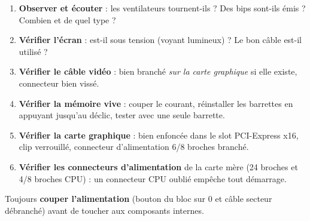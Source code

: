 \documentclass[11pt]{article}
\begin{document}
\begin{methode}
\begin{enumerate}
\item \textbf{Observer et écouter} : les ventilateurs tournent-ils ? Des bips sont-ils émis ? Combien et de quel type ?
\item \textbf{Vérifier l'écran} : est-il sous tension (voyant lumineux) ? Le bon câble est-il utilisé ?
\item \textbf{Vérifier le câble vidéo} : bien branché \emph{sur la carte graphique} si elle existe, connecteur bien vissé.
\item \textbf{Vérifier la mémoire vive} : couper le courant, réinstaller les barrettes en appuyant jusqu'au déclic, tester avec une seule barrette.
\item \textbf{Vérifier la carte graphique} : bien enfoncée dans le slot PCI-Express x16, clip verrouillé, connecteur d'alimentation 6/8 broches branché.
\item \textbf{Vérifier les connecteurs d'alimentation} de la carte mère (24 broches et 4/8 broches CPU) : un connecteur CPU oublié empêche tout démarrage.
\end{enumerate}
Toujours \textbf{couper l'alimentation} (bouton du bloc sur 0 et câble secteur débranché) avant de toucher aux composants internes.
\end{methode}
\end{document}
